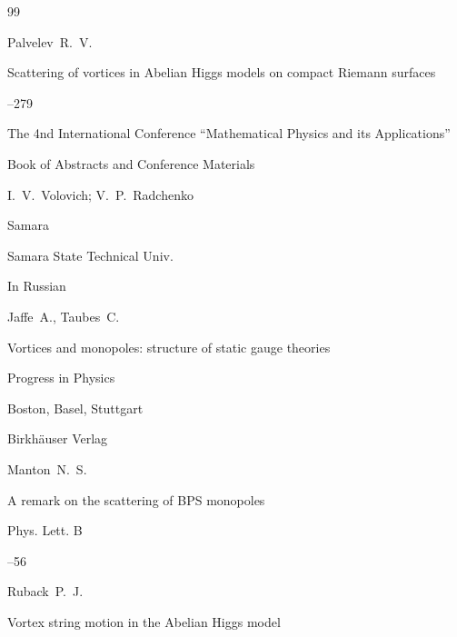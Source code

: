 \begin{thebibliography}{99}




\by  Palvelev~R.~V.

\paper Scattering of vortices in Abelian Higgs models on compact Riemann surfaces

--279

\inbook  The 4nd International Conference ``Mathematical Physics and its Applications''

\bookinfo Book of Abstracts and Conference Materials

\eds I.~V.~Volovich; V.~P.~Radchenko

\publaddr Samara

\publ Samara State Technical Univ.


\lang In Russian




\by Jaffe~A., Taubes~C.

\book Vortices and monopoles: structure of static gauge theories

\serial Progress in Physics


\publaddr Boston, Basel, Stuttgart

\publ Birkh\"auser Verlag










\by Manton~N.~S.  

\paper A remark on the scattering of BPS monopoles

\jour Phys. Lett. B 




--56







\by Ruback~P.~J. 

\paper Vortex string motion in the Abelian Higgs model 


\end{thebibliography}
